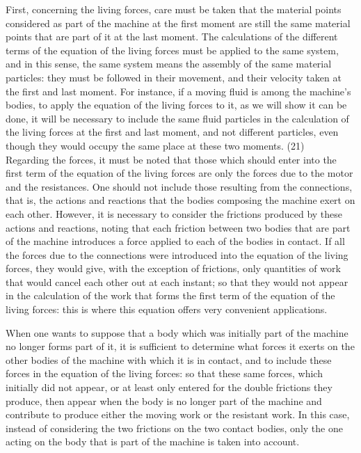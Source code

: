 \documentclass{book}
\begin{document}
First, concerning the living forces, care must be taken that the material points considered as part of the machine at the first moment are still the same material points that are part of it at the last moment. The calculations of the different terms of the equation of the living forces must be applied to the same system, and in this sense, the same system means the assembly of the same material particles: they must be followed in their movement, and their velocity taken at the first and last moment. For instance, if a moving fluid is among the machine's bodies, to apply the equation of the living forces to it, as we will show it can be done, it will be necessary to include the same fluid particles in the calculation of the living forces at the first and last moment, and not different particles, even though they would occupy the same place at these two moments.
\newpage
(21)\\

Regarding the forces, it must be noted that those which should enter into the first term of the equation of the living forces are only the forces due to the motor and the resistances. One should not include those resulting from the connections, that is, the actions and reactions that the bodies composing the machine exert on each other. However, it is necessary to consider the frictions produced by these actions and reactions, noting that each friction between two bodies that are part of the machine introduces a force applied to each of the bodies in contact. If all the forces due to the connections were introduced into the equation of the living forces, they would give, with the exception of frictions, only quantities of work that would cancel each other out at each instant; so that they would not appear in the calculation of the work that forms the first term of the equation of the living forces: this is where this equation offers very convenient applications.

When one wants to suppose that a body which was initially part of the machine no longer forms part of it, it is sufficient to determine what forces it exerts on the other bodies of the machine with which it is in contact, and to include these forces in the equation of the living forces: so that these same forces, which initially did not appear, or at least only entered for the double frictions they produce, then appear when the body is no longer part of the machine and contribute to produce either the moving work or the resistant work. In this case, instead of considering the two frictions on the two contact bodies, only the one acting on the body that is part of the machine is taken into account.
\end{document}
